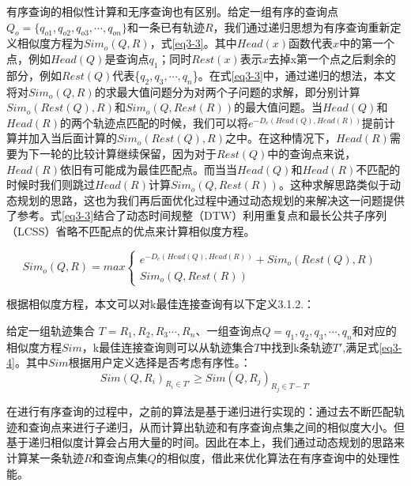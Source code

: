 有序查询的相似性计算和无序查询也有区别。给定一组有序的查询点$Q_{o} = \{q_{o1},q_{o2},q_{o3},\cdots, q_{on}\}$和一条已有轨迹$R$，我们通过递归思想为有序查询重新定义相似度方程为$Sim_{o}(Q,R)$，式\ref{eq3-3}。其中$Head(x)$函数代表$x$中的第一个点，例如$Head(Q)$是查询点$q_{1}$；同时$Rest(x)$表示$x$去掉x第一个点之后剩余的部分，例如$Rest(Q)$代表\{$q_{2},q_{3},\cdots, q_{n}$\}。在式\ref{eq3-3}中，通过递归的想法，本文将对$Sim_{o}(Q,R)$的求最大值问题分为对两个子问题的求解，即分别计算$Sim_{o}(Rest(Q),R)$和$Sim_{o}(Q,Rest(R))$的最大值问题。当$Head(Q)$和$Head(R)$的两个轨迹点匹配的时候，我们可以将$e^{-D_{e}(Head(Q), Head(R))}$提前计算并加入当后面计算的$Sim_{o}(Rest(Q),R)$之中。在这种情况下，$Head(R)$需要为下一轮的比较计算继续保留，因为对于$Rest(Q)$中的查询点来说，$Head(R)$依旧有可能成为最佳匹配点。而当当$Head(Q)$和$Head(R)$不匹配的时候时我们则跳过$Head(R)$计算$Sim_{o}(Q,Rest(R))$。这种求解思路类似于动态规划的思路，这也为我们再后面优化过程中通过动态规划的来解决这一问题提供了参考。式\ref{eq3-3}结合了动态时间规整（DTW）利用重复点和最长公共子序列（LCSS）省略不匹配点的优点来计算相似度方程。

\begin{equation} 
\label{eq3-3} 
Sim_{o}(Q,R)= max \left\{  
	\begin{array}{lr}  
    e^{-D_{e}(Head(Q), Head(R))} + Sim_{o}(Rest(Q),R) & \\
    Sim_{o}(Q,Rest(R)) &  
    \end{array}  
\right.  
\end{equation}  

根据相似度方程，本文可以对k最佳连接查询有以下定义3.1.2.：

\theoremstyle{definition}
\begin{definition}
	给定一组轨迹集合 $T = {R_{1}, R_{2}, R_{3} \cdots, R_{n}}$、一组查询点$Q = {q_{1},q_{2},q_{3},\cdots, q_{n}}$和对应的相似度方程$Sim$，k最佳连接查询则可以从轨迹集合$T$中找到k条轨迹$T'$,满足式\ref{eq3-4}。其中$Sim$根据用户定义选择是否考虑有序性。：
	\begin{equation}
		\label{eq3-4}
		Sim(Q,R_{i})_{R_{i} \in T'} \geq Sim(Q,R_{j})_{R_{j} \in T-T'}
	\end{equation}
\end{definition}

在进行有序查询的过程中，之前的算法是基于递归进行实现的：通过去不断匹配轨迹和查询点来进行子递归，从而计算出轨迹和有序查询点集之间的相似度大小。但基于递归相似度计算会占用大量的时间。因此在本上，我们通过动态规划的思路来计算某一条轨迹$R$和查询点集$Q$的相似度，借此来优化算法在有序查询中的处理性能。

